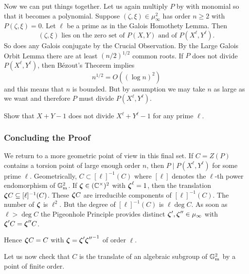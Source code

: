Now we can put things together. Let us again multiply $P$ by with
monomial so that it becomes a polynomial.
Suppose $(\zeta,\xi)\in \mu_\infty^2$ has order $n\ge 2$ with
$P(\zeta,\xi)=0$. Let $\ell$ be a prime as in the Galois Homothety
Lemma.
Then
\begin{equation}
  \label{eq:intersectionGm}
  (\zeta,\xi)\text{ lies on the zero set of $P(X,Y)$ and of 
    $P(X^{\ell},Y^{\ell})$}.
\end{equation}
So does any Galois
conjugate by the Crucial Observation.
By the Large Galois Orbit Lemma there are at least
$(n/2)^{1/2}$ common roots. If $P$ does not divide $P(X^\ell,Y^\ell)$,
then B\'ezout's Theorem implies
\begin{equation*}
  n^{1/2} = O((\log n)^2)
\end{equation*}
and this means that $n$ is bounded. But by assumption we may take $n$
as large as we want and therefore $P$ must divide $P(X^\ell,Y^\ell)$.

\begin{exercise}
  Show that $X+Y-1$ does not divide  $X^\ell + Y^\ell-1$ for any prime
  $\ell$. 
\end{exercise}

\subsubsection{Concluding the Proof}
\label{subsub:functrans}

We return to a more geometric point of view in this final set.
If $C=Z(P)$ contains a torsion point of large enough order $n$, then
$P \mid P(X^\ell,Y^\ell)$ for some prime $\ell$.
Geometrically, $C \subset [\ell]^{-1}(C)$ where $[\ell]$ denotes the $\ell$-th
power endomorphism of ${\mathbb{G}}_{\mathrm{m}}^2$.
If ${\boldsymbol{\zeta}}\in ({\mathbb{C}}^\times)^2$ with ${\boldsymbol{\zeta}}^\ell=1$, then the
translation ${\boldsymbol{\zeta}} C\subseteq [\ell]^{-1}(C)$. These ${\boldsymbol{\zeta}} C$ are
irreducible components of $[\ell]^{-1}(C)$. The number of ${\boldsymbol{\zeta}}$ is
$\ell^2$. But the degree of $[\ell]^{-1}(C)$ is $\ell \deg C$. As soon
as $\ell > \deg C$ the Pigeonhole Principle provides distinct
${\boldsymbol{\zeta}}',{\boldsymbol{\zeta}}''\in \mu_\infty$ with ${\boldsymbol{\zeta}}' C = {\boldsymbol{\zeta}}''C$.

Hence ${\boldsymbol{\zeta}} C=C$ with ${\boldsymbol{\zeta}} = {\boldsymbol{\zeta}}'{{\boldsymbol{\zeta}}''}^{-1}$ of order
$\ell$.

Let us now check that $C$ is the translate of an algebraic subgroup of
${\mathbb{G}}_{\mathrm{m}}^2$ by a point of finite order. %

